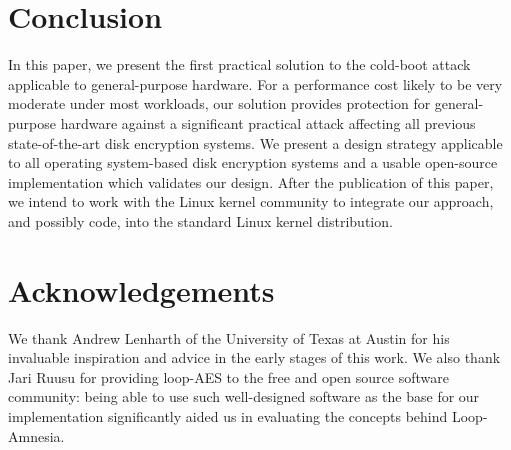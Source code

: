 \documentclass[letterpaper,twocolumn,nonatbib,10pt]{article}
\begin{document}
\section{Conclusion}

In this paper, we present the first practical solution to the
cold-boot attack applicable to general-purpose hardware.  For a
performance cost likely to be very moderate under most workloads, our
solution provides protection for general-purpose hardware against a
significant practical attack affecting all previous state-of-the-art
disk encryption systems.  We present a design strategy applicable to
all operating system-based disk encryption systems and a usable
open-source
implementation which
validates our design.  After the publication of this paper, we intend
to work with the Linux kernel community to integrate our approach, and
possibly code, into the standard Linux kernel distribution.

\section{Acknowledgements}

We thank Andrew Lenharth of the University of Texas at Austin for
his invaluable inspiration and advice in the early stages of this
work.  We also thank Jari Ruusu for providing loop-AES to the free and
open source software community: being able to use such well-designed
software as the base for our implementation significantly aided us in
evaluating the concepts behind Loop-Amnesia.



\end{document}

